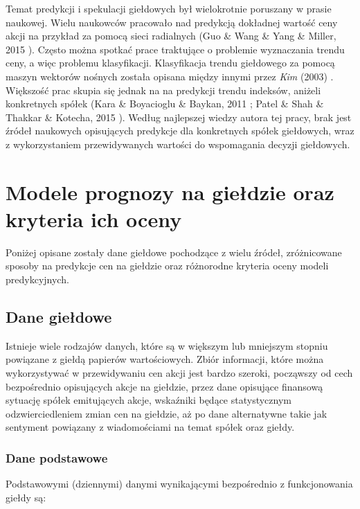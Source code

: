 \documentclass[a4paper, twoside, 11pt, openright]{article}
\begin{document}
\bigskip

Temat predykcji i spekulacji giełdowych był wielokrotnie poruszany w prasie naukowej. Wielu naukowców pracowało nad predykcją dokładnej wartość ceny akcji na przykład za pomocą sieci radialnych (Guo \& Wang \& Yang \& Miller, 2015 \cite{paper_regression_radial}). Często można spotkać prace traktujące o problemie wyznaczania trendu ceny, a więc problemu klasyfikacji. Klasyfikacja trendu giełdowego za pomocą maszyn wektorów nośnych została opisana między innymi przez \textit{Kim} (2003) \cite{paper_classification_svm}. Większość prac skupia się jednak na na predykcji trendu indeksów, aniżeli konkretnych spółek (Kara \& Boyacioglu \& Baykan, 2011 \cite{paper_classification_index_istanbul}; Patel \& Shah \& Thakkar \& Kotecha, 2015 \cite{paper_classification_index_sp500}). Według najlepszej wiedzy autora tej pracy, brak jest źródeł naukowych opisujących predykcje dla konkretnych spółek giełdowych, wraz z wykorzystaniem przewidywanych wartości do wspomagania decyzji giełdowych. 

\section{Modele prognozy na giełdzie oraz kryteria ich oceny}

Poniżej opisane zostały dane giełdowe pochodzące z wielu źródeł, zróżnicowane sposoby na predykcje cen na giełdzie oraz różnorodne kryteria oceny modeli predykcyjnych. 

\subsection{Dane giełdowe}

Istnieje wiele rodzajów danych, które są w większym lub mniejszym stopniu powiązane z giełdą papierów wartościowych. Zbiór informacji, które można wykorzystywać w przewidywaniu cen akcji jest bardzo szeroki, począwszy od cech bezpośrednio opisujących akcje na giełdzie, przez dane opisujące finansową sytuację spółek emitujących akcje, wskaźniki będące statystycznym odzwierciedleniem zmian cen na giełdzie, aż po dane alternatywne takie jak sentyment powiązany z wiadomościami na temat spółek oraz giełdy.

\subsubsection{Dane podstawowe}

Podstawowymi (dziennymi) danymi wynikającymi bezpośrednio z funkcjonowania giełdy są:
\end{document}
